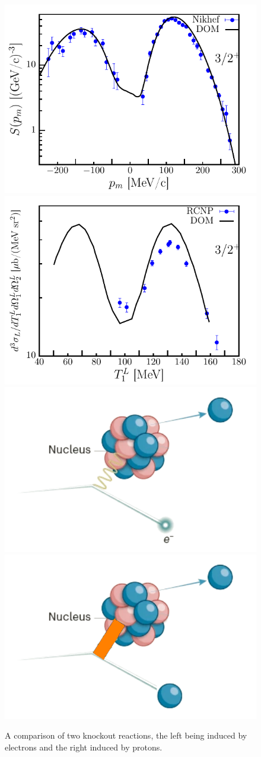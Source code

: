 \documentclass[12pt]{article}
\begin{document}
\begin{figure}
   \label{fig:eep_p2p}
   \begin{center}
      \vspace{-1.0cm}
      \includegraphics[width=0.49\linewidth]{figures/eep100.pdf}
      \includegraphics[width=0.49\linewidth]{figures/p2p.pdf}
      \includegraphics[width=0.49\linewidth]{figures/eep-schematic-alpha.png}
      \includegraphics[width=0.49\linewidth]{figures/p2p-schematic-alpha_oldV.png}
      \vspace{-1.3cm}
   \end{center}
   \caption{A comparison of two knockout reactions, the left being induced by electrons and the right induced by protons.}
      \vspace{-0.5cm}
\end{figure} 
\end{document}

